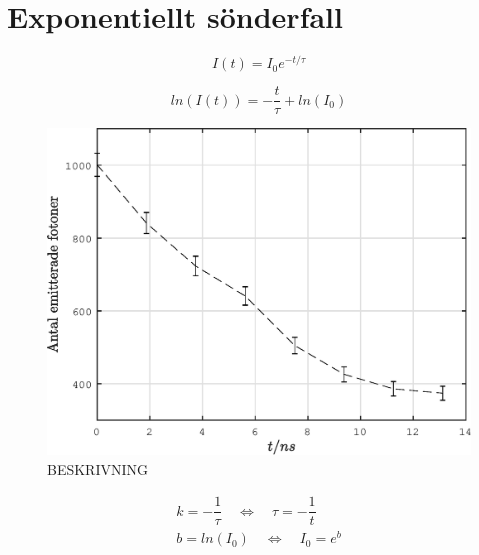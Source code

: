 \section*{Exponentiellt sönderfall}

\begin{equation} \label{eq:I_t}
	I(t) = I_0e^{-t/\tau}
\end{equation}

\begin{equation} \label{eq:log_I}
	ln(I(t)) = -\dfrac{t}{\tau} + ln(I_0)
\end{equation}

\begin{figure}[H]
    \centering
    \captionsetup{justification=centering,margin=2cm}
    \includegraphics[scale=0.4]{Resources/Graphics/fig1_1.eps}
    \caption{BESKRIVNING}
    \label{fig:1_1}
\end{figure}

\begin{eqnarray*}
	k = -\dfrac{1}{\tau} \quad \Leftrightarrow \quad
	\tau = -\dfrac{1}{t} \\
	b = ln(I_0) \quad \Leftrightarrow \quad
	I_0 = e^{b}
\end{eqnarray*}

